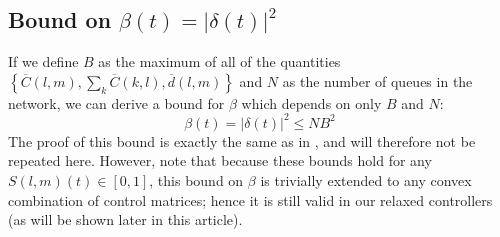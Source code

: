 \subsection*{Bound on $\beta(t) = \vert \delta (t)\vert^{2}$}
%
If we define $B$ as the maximum of all of the quantities $\left\{ \overline{C}(l,m), \sum_{k} \overline{C}(k,l),  \overline d (l,m) \right\}$ and $N$ as the number of queues in the network, we can derive a bound for $\beta$ which depends on only $B$ and $N$: 
\begin{equation}\label{betabound}
\beta(t)  = \big| \delta(t) \big|^2 \leq NB^2 
\end{equation}
The proof of this bound is exactly the same as in \cite{MaxPressureStochastic}, and will therefore not be repeated here. However, note that because these bounds hold for any $S(l,m)(t) \in [0,1]$, this bound on $\beta$ is trivially extended to any convex combination of control matrices; hence it is still valid in our relaxed controllers {\color{red}(as will be shown later in this article)}.


